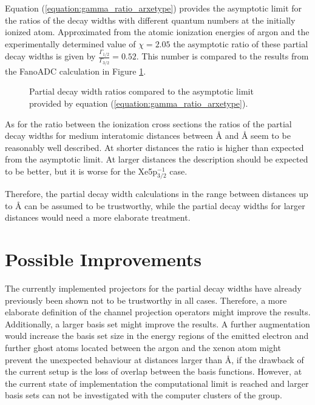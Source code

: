 Equation (\ref{equation:gamma_ratio_arxetype}) provides the asymptotic limit
for the ratios of the decay widths with different quantum numbers at the initially
ionized atom. Approximated from the atomic ionization energies of argon and the
experimentally determined value of $\chi = 2.05$ \cite{Jans97}
the asymptotic ratio of these partial decay widths is given by
$\frac{\Gamma_{1/2}}{\Gamma_{3/2}} = 0.52$. This number is compared to
the results from the FanoADC calculation in Figure
\ref{figure:arxe_rel_fano_ratios}.

\begin{figure}[]
  \centering
  
  \caption{Partial decay width ratios compared to the asymptotic limit provided
           by equation (\ref{equation:gamma_ratio_arxetype}).}
  \label{figure:arxe_rel_fano_ratios}
\end{figure}

As for the ratio between the ionization cross sections the ratios of the partial decay
widths for medium interatomic distances between \unit[5]{\AA} and \unit[15]{\AA}
seem to be reasonably well described. At shorter distances the ratio is higher
than expected from the asymptotic limit. At larger distances the description
should be expected to be better, but it is worse for the Xe5p$_{3/2}^{-1}$ case.

Therefore, the partial decay width calculations in the range between distances
up to \unit[10]{\AA} can be assumed to be trustworthy, while the
partial decay widths for larger distances would need a more elaborate treatment.



\section{Possible Improvements}
The currently implemented projectors for the partial decay widths have already
previously been shown not to be trustworthy in all cases. Therefore, a more elaborate
definition of the channel projection operators might improve the results.
Additionally, a larger basis set might improve the results. A further augmentation
would increase the basis set size in the energy regions of the emitted electron
and further ghost atoms located between the argon and the xenon atom might prevent
the unexpected behaviour at distances larger than \unit[10]{\AA}, if the
drawback of the current setup is the loss of overlap between the basis functions.
However, at the current state of implementation the computational limit is reached
and larger basis sets can not be investigated with the computer clusters of the
group.


